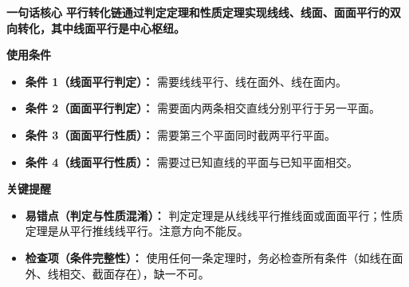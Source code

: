 \begin{summarybox}
	\textbf{\textcolor{CSummary}{一句话核心}}
	\textbf{平行转化链通过判定定理和性质定理实现线线、线面、面面平行的双向转化，其中线面平行是中心枢纽。}

	\medskip
	\textbf{\textcolor{CSummary}{使用条件}}
	\begin{itemize}[leftmargin=*, itemsep=0.5em, topsep=0.4em]
		\item \textbf{条件 1（线面平行判定）：} 需要线线平行、线在面外、线在面内。
		\item \textbf{条件 2（面面平行判定）：} 需要面内两条相交直线分别平行于另一平面。
		\item \textbf{条件 3（面面平行性质）：} 需要第三个平面同时截两平行平面。
		\item \textbf{条件 4（线面平行性质）：} 需要过已知直线的平面与已知平面相交。
	\end{itemize}

	\medskip
	\textbf{\textcolor{CSummary}{关键提醒}}
	\begin{itemize}[leftmargin=*, itemsep=0.5em, topsep=0.4em]
		\item \textbf{易错点（判定与性质混淆）：} 判定定理是从线线平行推线面或面面平行；性质定理是从平行推线线平行。注意方向不能反。
		\item \textbf{检查项（条件完整性）：} 使用任何一条定理时，务必检查所有条件（如线在面外、线相交、截面存在），缺一不可。
	\end{itemize}

\end{summarybox}
